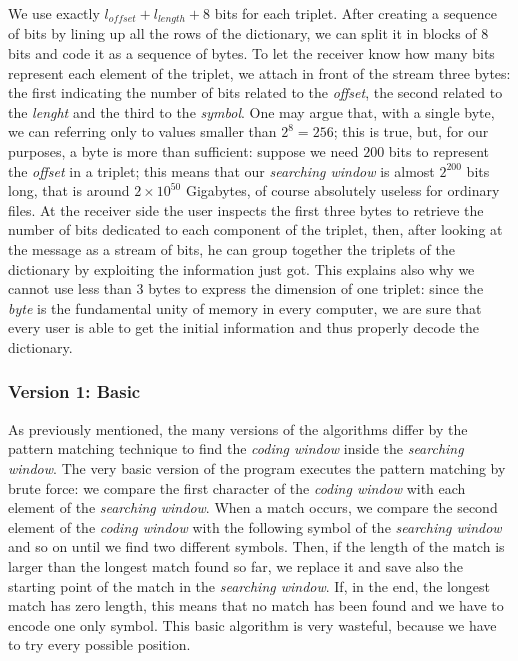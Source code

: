 We use exactly $l_{offset} + l_{length} + 8$ bits for each triplet. After creating a sequence of bits by lining up all the rows of the dictionary, we can split it in blocks of $8$ bits and code it as a sequence of bytes. To let the receiver know how many bits represent each element of the triplet, we attach in front of the stream three bytes: the first indicating the number of bits related to the \textit{offset}, the second related to the \textit{lenght} and the third to the \textit{symbol}. One may argue that, with a single byte, we can referring only to values smaller than $2^8 = 256$; this is true, but, for our purposes, a byte is more than sufficient: suppose we need $200$ bits to represent the \textit{offset} in a triplet; this means that our \textit{searching window} is almost $2^{200}$ bits long, that is around $2 \times 10^{50}$ Gigabytes, of course absolutely useless for ordinary files. At the receiver side the user inspects the first three bytes to retrieve the number of bits dedicated to each component of the triplet, then, after looking at the message as a stream of bits, he can group together the triplets of the dictionary by exploiting the information just got. This explains also why we cannot use less than $3$ bytes to express the dimension of one triplet: since the \textit{byte} is the fundamental unity of memory in every computer, we are sure that every user is able to get the initial information and thus properly decode the dictionary. 

\subsubsection{Version 1: Basic}
As previously mentioned, the many versions of the algorithms differ by the pattern matching technique to find the \textit{coding window} inside the \textit{searching window}. The very basic version of the program executes the pattern matching by brute force: we compare the first character of the \textit{coding window} with each element of the \textit{searching window}. When a match occurs, we compare the second element of the \textit{coding window} with the following symbol of the \textit{searching window} and so on until we find two different symbols. Then, if the length of the match is larger than the longest match found so far, we replace it and save also the starting point of the match in the \textit{searching window}. If, in the end, the longest match has zero length, this means that no match has been found and we have to encode one only symbol. This basic algorithm is very wasteful, because we have to try every possible position.

